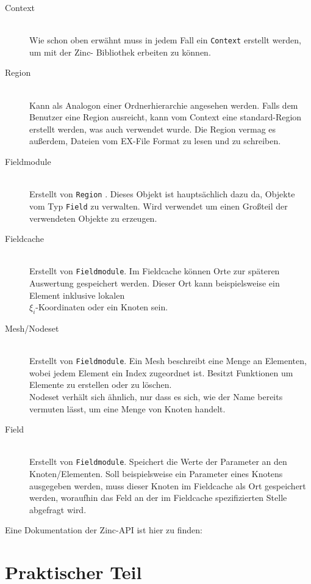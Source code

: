 \documentclass[
	a4paper,			%
	11pt,				%
	headsepline,		%
	bibtotoc,			%
	BCOR18mm,      		%
	DIV14,				%
	headings=normal,
	numbers=noenddot,
]{scrbook}
\theoremstyle{mythmstyle}
\theoremstyle{other}
\begin{document}
	\begin{description}
		\item[Context]\hfill \\
		Wie schon oben erwähnt muss in jedem Fall ein \verb!Context! erstellt werden, um mit der Zinc- Bibliothek
		erbeiten zu können.\\
		\item[Region]\hfill \\ 
		Kann als Analogon einer Ordnerhierarchie angesehen werden. Falls dem Benutzer eine Region ausreicht,
		kann vom Context eine standard-Region erstellt werden, was auch verwendet wurde. Die Region vermag es
		außerdem, Dateien vom EX-File Format zu lesen und zu schreiben.
		\item[Fieldmodule]\hfill \\ 
		Erstellt von \verb!Region! . Dieses Objekt ist hauptsächlich dazu da, Objekte vom Typ \verb!Field!
		zu verwalten. Wird verwendet um einen Großteil der verwendeten Objekte zu erzeugen. 
		\item[Fieldcache]\hfill \\ 
		Erstellt von \verb!Fieldmodule!. Im Fieldcache können Orte zur späteren Auswertung gespeichert werden.
		Dieser Ort kann beispielsweise ein Element inklusive lokalen \\$\xi_i$-Koordinaten oder ein Knoten sein.
		\item[Mesh/Nodeset]\hfill \\ 
		Erstellt von \verb!Fieldmodule!. Ein Mesh beschreibt eine Menge an Elementen, wobei jedem Element ein
		 Index zugeordnet ist. Besitzt Funktionen um Elemente zu erstellen oder zu löschen.\\
		 Nodeset verhält sich ähnlich, nur dass es sich, wie der Name bereits vermuten lässt, um eine Menge
		 von Knoten handelt. 
		\item[Field]\hfill \\ 
		Erstellt von \verb!Fieldmodule!. Speichert die Werte der Parameter an den Knoten/Elementen. Soll 
		beispielsweise ein Parameter eines Knotens ausgegeben werden, muss dieser Knoten im Fieldcache als Ort
		gespeichert werden, woraufhin das Feld an der im Fieldcache spezifizierten Stelle abgefragt wird.
		
\end{description}
	Eine Dokumentation der Zinc-API ist hier zu finden:\cite{opencmiss-zinc-api}
	\clearpage
	
	\chapter{Praktischer Teil}
\end{document}
